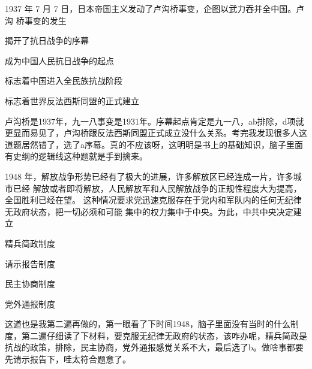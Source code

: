 \documentclass[lang=cn,newtx,10pt,scheme=chinese,pad,twocol]{zznote}
\begin{document}
\begin{exercise}1937 年 7 月 7 日，日本帝国主义发动了卢沟桥事变，企图以武力吞并全中国。卢沟 桥事变的发生
	\begin{choice}
		\item 揭开了抗日战争的序幕
		\item 成为中国人民抗日战争的起点
		\item 标志着中国进入全民族抗战阶段
		\item 标志着世界反法西斯同盟的正式建立
	\end{choice}
\end{exercise}
\begin{solution}
	卢沟桥是1937年，九一八事变是1931年。序幕起点肯定是九一八，ab排除，d项就更显而易见了，卢沟桥跟反法西斯同盟正式成立没什么关系。考完我发现很多人这道题居然错了，选了a序幕。真的不应该呀，这明明是书上的基础知识，脑子里面有史纲的逻辑线这种题就是手到擒来。
\end{solution}


\begin{exercise}1948 年，解放战争形势已经有了极大的进展，许多解放区已经连成一片，许多城市已经 解放或者即将解放，人民解放军和人民解放战争的正规性程度大为提高，全国胜利已经在望。 这种情况要求党迅速克服存在于党内和军队内的任何无纪律无政府状态，把一切必须和可能 集中的权力集中于中央。为此，中共中央决定建立
	\begin{choice}
		\item 精兵简政制度
		\item 请示报告制度
		\item 民主协商制度
		\item 党外通报制度
	\end{choice}
\end{exercise}
\begin{solution}
	这道也是我第二遍再做的，第一眼看了下时间1948，脑子里面没有当时的什么制度，第二遍仔细读了下材料，要克服无纪律无政府的状态，该咋办呢，精兵简政是抗战的政策，排除，民主协商，党外通报感觉关系不大，最后选了b。做啥事都要先请示报告下，哇太符合题意了。
\end{solution}
\end{document}
